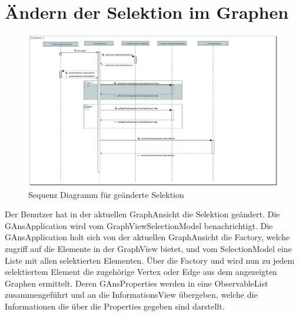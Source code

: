 \newpage

\section{Ändern der Selektion im Graphen}

\begin{figure}[!htbp]
	\centering
	\includegraphics[width=450pt]{resourcen/SeqDiagramSelection.PDF}
	\caption{Sequenz Diagramm für geänderte Selektion}
	\label{fig:seq:selection}
\end{figure}

Der Benutzer hat in der aktuellen GraphAnsicht die Selektion geändert. Die GAnsApplication wird vom GraphViewSelectionModel benachrichtigt. Die GAnsApplication holt sich von der aktuellen GraphAnsicht die Factory, welche zugriff auf die Elemente in der GraphView bietet, und vom SelectionModel eine Liste mit allen selektierten Elementen. Über die Factory und wird nun zu jedem selektiertem Element die zugehörige Vertex oder Edge aus dem angezeigten Graphen ermittelt. Deren GAnsProperties werden in eine ObservableList zusammengeführt und an die InformationsView übergeben, welche die Informationen die über die Properties gegeben sind darstellt.

\newpage

